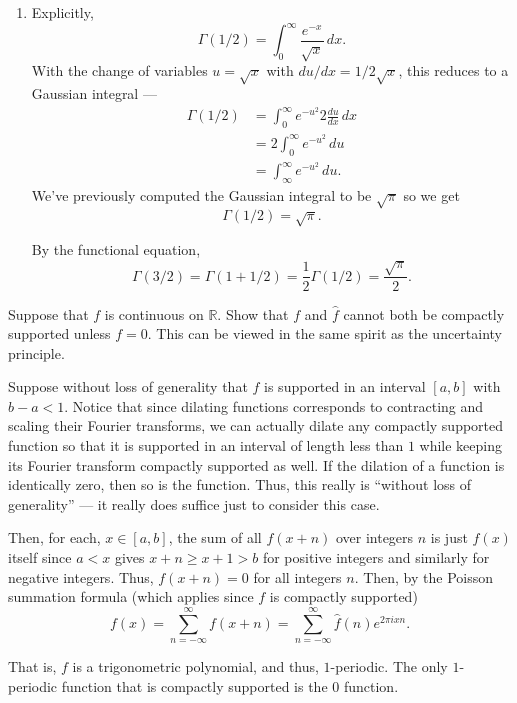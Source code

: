 \documentclass[12 pt, letterpaper]{hmcpset}
\begin{document}
\begin{solution}
\begin{enumerate}
		\item Explicitly,
			\[
				\Gamma(1 / 2) = \int_{0}^{\infty} \frac{e^{-x}}{\sqrt{x}} \, dx.
			\]
			With the change of variables $u = \sqrt{x}$ with $du / dx = 1 / 2 \sqrt{x}$, this reduces to a Gaussian integral ---
			\begin{align*}
				\Gamma(1 / 2) & = \int_{0}^{\infty} e^{-u^{2}} 2 \frac{du}{dx} \, dx \\
					      & = 2 \int_{0}^{\infty} e^{-u^{2}} \, du \\
					      & = \int_{\infty}^{\infty} e^{-u^{2}} \, du.
			\end{align*}
			We've previously computed the Gaussian integral to be $\sqrt{\pi}$ so we get
			\[
				\Gamma(1 / 2) = \sqrt{\pi}.
			\]

			By the functional equation,
			\[
				\Gamma(3 / 2) = \Gamma(1 + 1/2) = \frac{1}{2} \Gamma(1/2) = \frac{\sqrt{\pi}}{2}.
			\]
	\end{enumerate}
\end{solution}

\pagebreak

\begin{problem}[S \& S \S 5.5 \#21.]
	Suppose that $f$ is continuous on $\mathbb{R}$. Show that $f$ and $\hat{f}$ cannot both be compactly supported unless $f = 0$. This can be viewed in the same spirit as the uncertainty principle.
\end{problem}

\begin{solution}
	Suppose without loss of generality that $f$ is supported in an interval $[a, b]$ with $b - a < 1$. Notice that since dilating functions corresponds to contracting and scaling their Fourier transforms, we can actually dilate any compactly supported function so that it is supported in an interval of length less than $1$ while keeping its Fourier transform compactly supported as well. If the dilation of a function is identically zero, then so is the function. Thus, this really is ``without loss of generality'' --- it really does suffice just to consider this case.

	Then, for each, $x \in [a, b]$, the sum of all $f(x + n)$ over integers $n$ is just $f(x)$ itself since $a < x$ gives $x + n \ge x + 1 > b$ for positive integers and similarly for negative integers. Thus, $f(x + n) = 0$ for all integers $n$. Then, by the Poisson summation formula (which applies since $f$ is compactly supported)
	\[
		f(x) = \sum_{n = -\infty}^{\infty} f(x + n) = \sum_{n = -\infty}^{\infty} \hat{f}(n) e^{2 \pi i x n}.
	\]

	That is, $f$ is a trigonometric polynomial, and thus, $1$-periodic. The only $1$-periodic function that is compactly supported is the $0$ function.
\end{solution}
\end{document}
